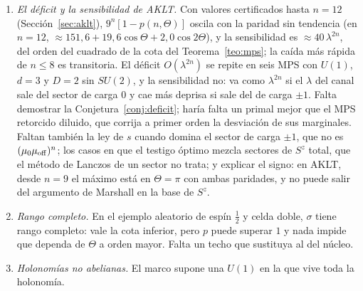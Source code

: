 \documentclass[11pt,a4paper]{article}
\theoremstyle{remark}
\begin{document}
\begin{enumerate}
  $0{,}03$\,\% en $2\le\Delta\le10$ y descartan $\tfrac14e^{\pi^2/(2\gamma)}$, que se desvía hasta
  un $5$\,\%. La ley y su prefactor están derivados sin rigor (Observación~\ref{obs:doblete}):
  $R_n=\pi^{-1}\sinh\gamma\,K(k)\sqrt{2k'/(\pi n)}\,e^{-n/(2\xi_{\rm JKM})}(1+O(1/n))$, el término de
  un espinón en el canal espejo, con la normalización de Lüscher tomada como dato; falta derivarla
  de las ecuaciones de Bethe del doblete. El caso
  $\kappa>\pi/2$, con $\Delta_\infty<0$, está cubierto numéricamente hasta $\kappa=8$ con las
  ecuaciones en momentos (párrafo «$\Delta_\infty<0$» de la Sección~\ref{sec:neel}), que siguen
  los pares de raíces complejas que aparecen por debajo de cada umbral; cuando $\kappa\to\infty$,
  $\Delta_\infty\to-1$ y el número de pares crece sin cota. Los umbrales,
  $\pi-\gamma_c^{(k)}=\Phi/(4k)$ y $(\pi-\Phi)/(4k+1)$, están derivados sin rigor
  (Observación~\ref{obs:umbrales}); falta demostrar que el grupo que llega al infinito es el de las
  raíces extremas y que lo hace entero a la vez.
\item \emph{El déficit y la sensibilidad de AKLT.} Con valores certificados hasta $n=12$
  (Sección~\ref{sec:aklt}), $9^n[1-p(n,\Theta)]$ oscila con la paridad sin tendencia (en $n=12$,
  $\approx151{,}6+19{,}6\cos\Theta+2{,}0\cos2\Theta$), y la sensibilidad es
  $\approx40\,\lambda^{2n}$, del orden del cuadrado de la cota del Teorema~\ref{teo:mps}; la caída más rápida
  de $n\le8$ es transitoria. El déficit $O(\lambda^{2n})$ se repite
  en seis MPS con $U(1)$, $d=3$ y $D=2$ sin $SU(2)$, y la sensibilidad no: va como $\lambda^{2n}$
  si el $\lambda$ del canal sale del sector de carga $0$ y cae más deprisa si sale del de carga
  $\pm1$. Falta demostrar la Conjetura~\ref{conj:deficit}; haría falta un primal mejor que el MPS
  retorcido diluido, que corrija a primer orden la desviación de sus marginales. Faltan también la
  ley de $s$ cuando domina el sector de carga $\pm1$, que no es $(\mu_0\mu_{\rm off})^n$; los
  casos en que el testigo óptimo mezcla sectores de $S^z$ total, que el método de Lanczos de un
  sector no trata; y explicar el signo: en AKLT, desde $n=9$ el máximo está en $\Theta=\pi$ con
  ambas paridades, y no puede salir del argumento de Marshall en la base de $S^z$.
\item \emph{Rango completo.} En el ejemplo aleatorio de espín $\tfrac12$ y celda doble, $\sigma$ tiene
  rango completo: vale la cota inferior, pero $p$ puede superar $1$ y nada impide que dependa de
  $\Theta$ a orden mayor. Falta un techo que sustituya al del núcleo.
\item \emph{Holonomías no abelianas.} El marco supone una $U(1)$ en la que vive toda la holonomía.

\end{enumerate}
\end{document}
